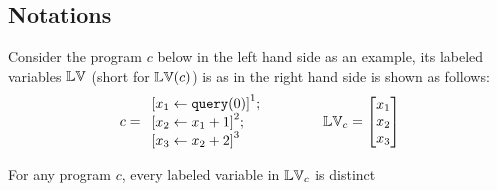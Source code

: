 \subsection{Notations}
%
\label{subsec:alg_notation}
%
Consider the program $c$ below in the left hand side as an example, its labeled variables $\mathbb{LV}$ (short for $\mathbb{LV}({c})$) is as in the right hand side is shown as follows:
$$
{c} = 
\begin{array}{l}
\left[{\assign {x_1} {\query(0)}}		\right]^1;
\\
\left[{\assign {x_2} {x_1 + 1}}		\right]^2;
\\
\left[{\assign {x_3} {x_2 + 2}}		\right]^3
\end{array}
~~~~~~~~~~~~
\lvar_c = \left [ 
\begin{matrix}
{x_1} \\
{x_2} \\
{x_3} \\
\end{matrix} \right ]
$$
%
\begin{lem}
For any program ${c}$, every labeled variable in $\mathbb{LV}_{c}$ is distinct
\end{lem}
%
